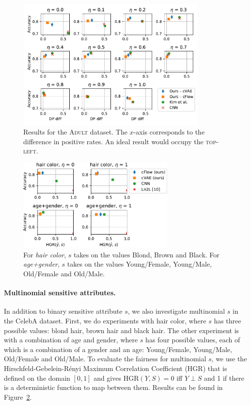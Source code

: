 \begin{figure}[htb]
  \centering
  \includegraphics[width=0.85\textwidth]{./Figures/nosinn_adult_multiplot_all_landscape_diff.pdf}
  \caption{
      Results for the \textsc{Adult} dataset.
      The $x$-axis corresponds to the difference in positive rates.
      An ideal result would occupy the \textsc{top-left}.
  }%
  \label{fig:big-adult-chart}
\end{figure}
\begin{figure}[htb]
    \centering
    \includegraphics[width=0.7\textwidth]{Figures/celeba_multi_s.pdf}
    \caption{
        For \emph{hair color}, $s$ takes on the values Blond, Brown and Black.
        For \emph{age+gender}, $s$ takes on the values Young/Female, Young/Male, Old/Female and Old/Male.
    }%
    \label{fig:multi-s}
\end{figure}

\paragraph{Multinomial sensitive attributes.}
In addition to binary sensitive attribute $s$,
we also investigate multinomial $s$ in the CelebA dataset.
First, we do experiments with hair color, where $s$ has three possible values:
blond hair, brown hair and black hair.
The other experiment is with a combination of age and gender,
where $s$ has four possible values, each of which is a combination of a gender and an age:
Young/Female, Young/Male, Old/Female and Old/Male.
To evaluate the fairness for multinomial $s$, we use the Hirschfeld-Gebelein-R\'enyi Maximum Correlation Coefficient (HGR) \citep{mary2019fairness} that is defined on the domain $[0, 1]$ and gives $\text{HGR}(Y,S)=0$ iff $Y \perp S$
and 1 if there is a deterministic function to map between them.
Results can be found in Figure~\ref{fig:multi-s}.\\

